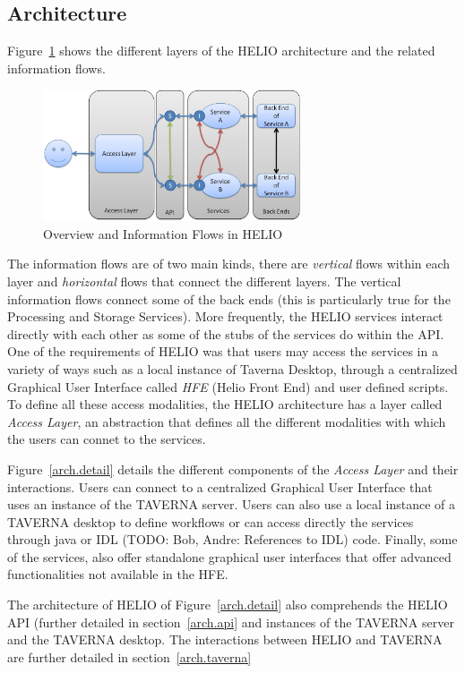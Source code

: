 \subsection{Architecture}

Figure~\ref{arch.overview} shows the different layers of the HELIO architecture and the related information flows. 

\begin{figure}[!t]
\centering
\includegraphics[width=3in]{HELIO-Architecture-Overview.pdf}
\caption{Overview and Information Flows in HELIO}
\label{arch.overview}
\end{figure}

The information flows are of two main kinds, there are \emph{vertical} flows within each layer and \emph{horizontal} flows that connect the different layers.
The vertical information flows connect some of the back ends (this is particularly true for the Processing and Storage Services). More frequently, the HELIO services
interact directly with each other as some of the stubs of the services do within the API.
One of the requirements of HELIO was that users may access the services in a variety of ways such as a local instance of Taverna Desktop, through a 
centralized Graphical User Interface called \emph{HFE} (Helio Front End) and user defined scripts. To define all these access modalities, the HELIO
architecture has a layer called \emph{Access Layer}, an abstraction that defines all the different modalities with which the users can connet to the services.

Figure~\ref{arch.detail} details the different components of the \emph{Access Layer} and their interactions. Users can connect to a centralized Graphical User Interface that uses an instance of the TAVERNA server.
Users can also use a local instance of a TAVERNA desktop to define workflows or can access directly the services through java or IDL (TODO: Bob, Andre: References to IDL) code.
Finally, some of the services, also offer standalone graphical user interfaces that offer advanced functionalities not available in the HFE.
  
The architecture of HELIO of Figure~\ref{arch.detail} also comprehends the HELIO API (further detailed in section~\ref{arch.api} and instances of the TAVERNA server and the TAVERNA desktop. The interactions between HELIO and TAVERNA are 
further detailed in section~\ref{arch.taverna} 

